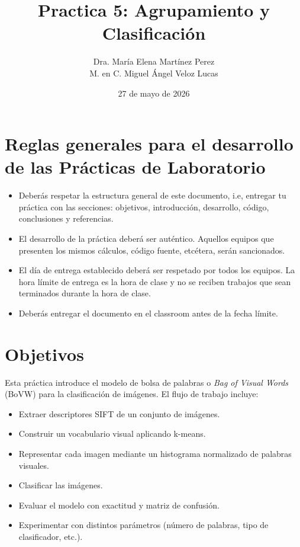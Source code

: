 \documentclass{article}
\title{Practica 5: Agrupamiento y Clasificación}
\author{Dra. María Elena Martínez Perez \\
M. en C. Miguel Ángel Veloz Lucas}
\date{27 de mayo de 2026}
\begin{document}
\maketitle
\section{Reglas generales para el desarrollo de las Prácticas de Laboratorio}

\begin{itemize}
\item Deberás respetar la estructura general de este documento, i.e, entregar tu práctica con las secciones: objetivos, introducción, desarrollo, código, conclusiones y referencias.
\item El desarrollo de la práctica deberá ser auténtico. Aquellos equipos que presenten los mismos cálculos, código fuente, etcétera, serán sancionados.
\item El día de entrega establecido deberá ser respetado por todos los equipos. La hora límite de entrega es la hora de clase y no se reciben trabajos que sean terminados durante la hora de clase.
\item  Deberás entregar el documento en el classroom antes de la fecha límite.
\end{itemize}

\section{Objetivos}

    Esta práctica introduce el modelo de bolsa de palabras o \textit{Bag of Visual Words} (BoVW) para la clasificación de imágenes. El flujo de trabajo incluye:
    \begin{itemize}
    \item Extraer descriptores SIFT de un conjunto de imágenes.
    \item Construir un vocabulario visual aplicando k-means.
    \item Representar cada imagen mediante un histograma normalizado de palabras visuales.
    \item Clasificar las imágenes.
    \item Evaluar el modelo con exactitud y matriz de confusión.
    \item Experimentar con distintos parámetros (número de palabras, tipo de clasificador, etc.).


\end{itemize}
\end{document}
